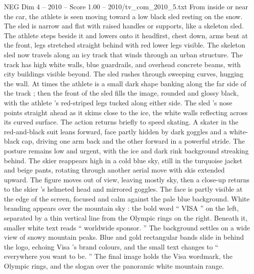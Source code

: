 \begin{textsample}{NEG Dim 4 – 2010 – Score 1.00 – 2010/tv\_com\_2010\_5.txt}
From inside or near the car, the athlete is seen moving toward a low black sled resting on the snow.
The sled is narrow and flat with raised handles or supports, like a skeleton sled.
The athlete steps beside it and lowers onto it headfirst, chest down, arms bent at the front, legs stretched straight behind with red lower legs visible.
The skeleton sled now travels along an icy track that winds through an urban structure.
The track has high white walls, blue guardrails, and overhead concrete beams, with city buildings visible beyond.
The sled rushes through sweeping curves, hugging the wall.
At times the athlete is a small dark shape banking along the far side of the track ; then the front of the sled fills the image, rounded and glossy black, with the athlete ’s red-striped legs tucked along either side.
The sled ’s nose points straight ahead as it skims close to the ice, the white walls reflecting across its curved surface.
The action returns briefly to speed skating.
A skater in the red-and-black suit leans forward, face partly hidden by dark goggles and a white-black cap, driving one arm back and the other forward in a powerful stride.
The posture remains low and urgent, with the ice and dark rink background streaking behind.
The skier reappears high in a cold blue sky, still in the turquoise jacket and beige pants, rotating through another aerial move with skis extended upward.
The figure moves out of view, leaving mostly sky, then a close-up returns to the skier ’s helmeted head and mirrored goggles.
The face is partly visible at the edge of the screen, focused and calm against the pale blue background.
White branding appears over the mountain sky : the bold word “ VISA ” on the left, separated by a thin vertical line from the Olympic rings on the right.
Beneath it, smaller white text reads “ worldwide sponsor. ” The background settles on a wide view of snowy mountain peaks.
Blue and gold rectangular bands slide in behind the logo, echoing Visa ’s brand colours, and the small text changes to “ everywhere you want to be. ” The final image holds the Visa wordmark, the Olympic rings, and the slogan over the panoramic white mountain range.

\end{textsample}
